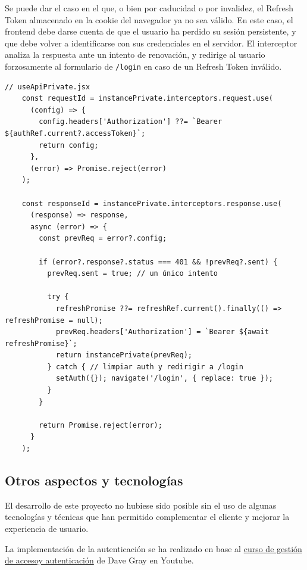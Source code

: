 \documentclass[11pt]{article}
\begin{document}
          Se puede dar el caso en el que, o bien por caducidad o por invalidez, el
          Refresh Token almacenado en la cookie del navegador ya no sea válido. En este
          caso, el frontend debe darse cuenta de que el usuario ha perdido su sesión
          persistente, y que debe volver a identificarse con sus credenciales en el
          servidor. El interceptor analiza la respuesta ante un intento de renovación, y
          redirige al usuario forzosamente al formulario de \texttt{/login} en caso de un
          Refresh Token inválido.

          \begin{lstlisting}[style=ReactStyle]
    // useApiPrivate.jsx
    const requestId = instancePrivate.interceptors.request.use(
      (config) => {
        config.headers['Authorization'] ??= `Bearer ${authRef.current?.accessToken}`;
        return config;
      },
      (error) => Promise.reject(error)
    );

    const responseId = instancePrivate.interceptors.response.use(
      (response) => response,
      async (error) => {
        const prevReq = error?.config;

        if (error?.response?.status === 401 && !prevReq?.sent) {
          prevReq.sent = true; // un único intento

          try {
            refreshPromise ??= refreshRef.current().finally(() => refreshPromise = null);
            prevReq.headers['Authorization'] = `Bearer ${await refreshPromise}`;
            return instancePrivate(prevReq);
          } catch { // limpiar auth y redirigir a /login
            setAuth({}); navigate('/login', { replace: true });
          }
        }

        return Promise.reject(error);
      }
    );
\end{lstlisting}

  \subsection{Otros aspectos y tecnologías}

      El desarrollo de este proyecto no hubiese sido posible sin el uso de algunas
      tecnologías y técnicas que han permitido complementar el cliente y mejorar la
      experiencia de usuario.

      La implementación de la autenticación se ha realizado en base al
      \href{https://www.youtube.com/playlist?list=PL0Zuz27SZ-6PRCpm9clX0WiBEMB70FWwd}{curso
          de gestión de accesoy autenticación} de Dave Gray en Youtube.
\end{document}
